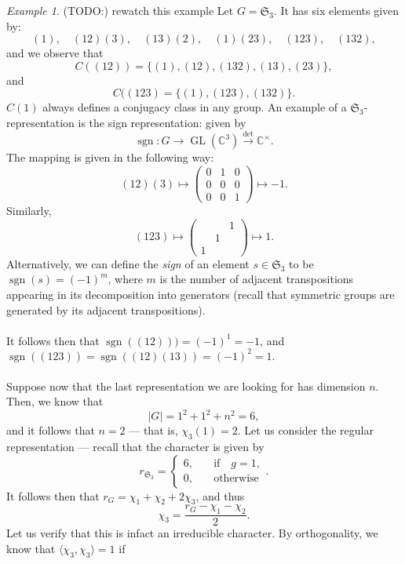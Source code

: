 \documentclass[a4paper]{report}
\theoremstyle{definition}
\theoremstyle{remark}
\theoremstyle{proposition}
\theoremstyle{conjecture}
\theoremstyle{lemma}
\theoremstyle{corollary}
\theoremstyle{exercise}
\theoremstyle{example}
\newtheorem{example}{Example}
\newcommand{\C}{\mathbb{C}}
\newcommand{\on}{\operatorname}
\begin{document}
\begin{example}
    (TODO:) rewatch this example
    Let $G = \mathfrak{S}_3$. It has six elements given by:
    $$(1), \quad (12)(3), \quad (13)(2), \quad (1)(23), \quad (123), \quad (132),$$
    and we observe that $$C( (12) ) = \lbrace (1), (12), (132), (13), (23)\rbrace,$$
    and $$C( (123) = \lbrace (1), (123), (132)\rbrace.$$ 
    $C(1)$ always defines a conjugacy class in any group.
    An example of a $\mathfrak{S}_3$-representation is the sign representation:
    given by 
    $$\on{sgn} : G \longrightarrow \on{GL}(\C^3) \stackrel{\det}{\longrightarrow} \C^\times.$$
    The mapping is given in the following way:
    $$(12)(3) \longmapsto \begin{pmatrix}
        0&1&0\\
        0&0&0\\
        0&0&1
    \end{pmatrix} \longmapsto -1.$$
    Similarly, 
    $$(123) \longmapsto \begin{pmatrix}
        &&1\\
        &1&\\
        1&&
    \end{pmatrix} \longmapsto 1.$$
    Alternatively, we can define the \emph{sign} of an element 
    $s\in \mathfrak{S}_3$ to be $\on{sgn}(s) = (-1)^m$, where $m$ is the 
    number of adjacent transpositions appearing in its decomposition into 
    generators (recall that symmetric groups are generated by its adjacent 
    transpositions).\\\\
    It follows then that 
$\on{sgn}((12) )) = (-1)^1 = -1$, and $\on{sgn}( (123)) = \on{sgn}( (12)(13)) = (-1)^2 = 1.$\\\\
    Suppose now that the last representation we are looking for has dimension 
    $n$. Then, we know that $$\vert G \vert = 1^2 + 1^2 + n^2 = 6,$$
    and it follows that $n=2$ --- that is, $\chi_3(1) = 2$.
    Let us consider the regular representation --- recall that 
    the character is given by
    $$r_{\mathfrak{S}_3} = \begin{cases}
        6,\quad &\text{if} \quad g =1,\\
        0, \quad &\text{otherwise}
    \end{cases}.$$
    It follows then that 
    $r_G = \chi_1 + \chi_2 + 2\chi_3$, and thus 
    $$\chi_3 = \frac{r_G - \chi_1 - \chi_2}{2}.$$
    Let us verify that this is infact an irreducible character. By
    orthogonality, we know that $\langle \chi_3,\chi_3\rangle =1$ if 

\end{example}
\end{document}
